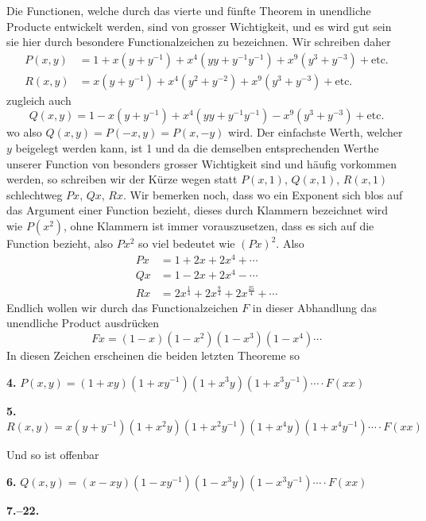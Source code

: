 \documentclass[10pt,a4paper]{article}
\begin{document}
Die Functionen, welche durch das vierte und f\"unfte Theorem in unendliche Producte entwickelt werden, sind von grosser Wichtigkeit, und es wird gut sein sie hier durch besondere Functionalzeichen zu bezeichnen. Wir schreiben daher
%
\begin{align*}
P(x, y) &= 1 + x(y + y^{-1}) + x^4(yy + y^{-1}y^{-1}) + x^9(y^3 + y^{-3}) + \text{etc.} \\
R(x, y) &= x(y + y^{-1}) + x^4(y^2 + y^{-2}) + x^9(y^3 + y^{-3}) + \text{etc.}
\end{align*}
%
zugleich auch
%
\begin{equation*}
Q(x, y) = 1 - x(y + y^{-1}) + x^4(yy + y^{-1}y^{-1}) - x^9(y^3 + y^{-3}) + \text{etc.}
\end{equation*}
%
wo also $Q(x, y) = P(-x, y) = P(x, -y)$ wird. Der einfachste Werth, welcher $y$ beigelegt werden kann, ist 1 und da die demselben entsprechenden Werthe unserer Function von besonders grosser Wichtigkeit sind und h\"aufig vorkommen werden, so schreiben wir der K\"urze wegen statt $P(x, 1)$, $Q(x, 1)$, $R(x, 1)$ schlechtweg $Px$, $Qx$, $Rx$. Wir bemerken noch, dass wo ein Exponent sich blos auf das Argument einer Function bezieht, dieses durch Klammern bezeichnet wird wie $P(x^2)$, ohne Klammern ist immer vorauszusetzen, dass es sich auf die Function bezieht, also $Px^2$ so viel bedeutet wie $(Px)^2$. Also
%
\begin{align*}
Px &= 1 + 2x + 2x^4 + \cdots \\
Qx &= 1 - 2x + 2x^4 - \cdots \\
Rx &= 2x^{\frac{1}{4}} + 2x^{\frac{9}{4}} + 2x^{\frac{25}{4}} + \cdots
\end{align*}
%
Endlich wollen wir durch das Functionalzeichen $F$ in dieser Abhandlung das unendliche Product ausdr\"ucken
%
\begin{equation*}
Fx = (1 - x)(1 - x^2)(1 - x^3)(1 - x^4) \cdots
\end{equation*}
%
In diesen Zeichen erscheinen die beiden letzten Theoreme so

\textbf{4.} $P(x, y) = (1 + xy)(1 + xy^{-1})(1 + x^3y)(1 + x^3y^{-1}) \cdots \cdot F(xx)$

\textbf{5.} $R(x, y) = x(y + y^{-1})(1 + x^2y)(1 + x^2y^{-1})(1 + x^4y)(1 + x^4y^{-1}) \cdots \cdot F(xx)$

Und so ist offenbar

\textbf{6.} $Q(x, y) = (x - xy)(1 - xy^{-1})(1 - x^3y)(1 - x^3y^{-1}) \cdots \cdot F(xx)$

\newpage
\textbf{7.--22.}
\end{document}
